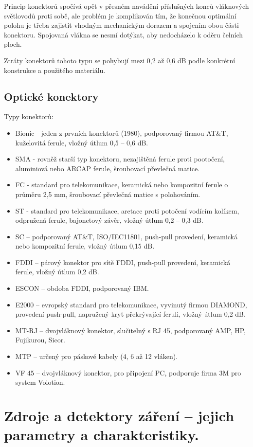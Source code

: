 Princip konektorů spočívá opět v přesném navádění příslušných konců vláknových světlovodů proti sobě, ale problém je komplikován tím, že konečnou optimální polohu je třeba zajistit vhodným mechanickým dorazem a spojením obou části konektoru. Spojovaná vlákna se nesmí dotýkat, aby nedocházelo k oděru čelních ploch.

Ztráty konektorů tohoto typu se pohybují mezi 0,2 až 0,6 dB podle konkrétní konstrukce a použitého materiálu.

\subsection{Optické konektory}
Typy konektorů:
\begin{itemize}
    \item Bionic - jeden z prvních konektorů (1980), podporovaný firmou AT\&T, kuželovitá ferule, vložný útlum 0,5 – 0,6 dB.
    \item SMA - rovněž starší typ konektoru, nezajištěná ferule proti pootočení, aluminiová nebo ARCAP ferule, šroubovací převlečná matice.
    \item FC - standard pro telekomunikace, keramická nebo kompozitní ferule o průměru 2,5 mm, šroubovací převlečná matice s polohováním.
    \item ST - standard pro telekomunikace, aretace proti potočení vodícím kolíkem, odpružená ferule, bajonetový závěr, vložný útlum 0,2 – 0,3 dB.
    \item SC – podporovaný AT\&T, ISO/IEC11801, push-pull provedení, keramická nebo kompozitní ferule, vložný útlum 0,15 dB.
    \item FDDI – párový konektor pro sítě FDDI, push-pull provedení, keramická ferule, vložný útlum 0,2 dB.
    \item ESCON – obdoba FDDI, podporovaný IBM.
    \item E2000 – evropský standard pro telekomunikace, vyvinutý firmou DIAMOND, provedení push-pull, napružený kryt překrývající feruli, vložný útlum 0,2 dB.
    \item MT-RJ – dvojvláknový konektor, slučitelný s RJ 45, podporovaný AMP, HP, Fujikurou, Sicor.
    \item MTP – určený pro páskové kabely (4, 6 až 12 vláken).
    \item VF 45 – dvojvláknový konektor, pro připojení PC, podporuje firma 3M pro system Volotion.
\end{itemize}

\clearpage
\section{Zdroje a detektory záření – jejich parametry a charakteristiky.}
